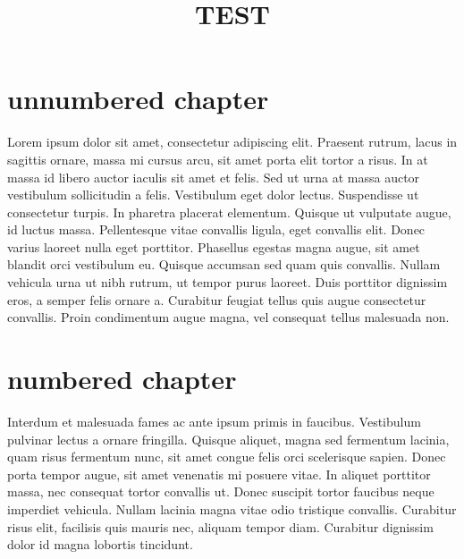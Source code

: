 \documentclass[oneside]{book}
\title {TEST}
\newcommand\addtocchapter[1]{\addcontentsline{toc}{chapter}{#1}}
\begin{document}
\frontmatter


\maketitle

\clearpage

\tableofcontents

\mainmatter

\chapter*{unnumbered chapter}
\addtocchapter{unnumbered chapter}

Lorem ipsum dolor sit amet, consectetur adipiscing elit. Praesent rutrum, lacus in sagittis ornare, massa mi cursus arcu, sit amet porta elit tortor a risus. In at massa id libero auctor iaculis sit amet et felis. Sed ut urna at massa auctor vestibulum sollicitudin a felis. Vestibulum eget dolor lectus. Suspendisse ut consectetur turpis. In pharetra placerat elementum. Quisque ut vulputate augue, id luctus massa. Pellentesque vitae convallis ligula, eget convallis elit. Donec varius laoreet nulla eget porttitor. Phasellus egestas magna augue, sit amet blandit orci vestibulum eu. Quisque accumsan sed quam quis convallis. Nullam vehicula urna ut nibh rutrum, ut tempor purus laoreet. Duis porttitor dignissim eros, a semper felis ornare a. Curabitur feugiat tellus quis augue consectetur convallis. Proin condimentum augue magna, vel consequat tellus malesuada non.


\chapter{numbered chapter}

Interdum et malesuada fames ac ante ipsum primis in faucibus. Vestibulum pulvinar lectus a ornare fringilla. Quisque aliquet, magna sed fermentum lacinia, quam risus fermentum nunc, sit amet congue felis orci scelerisque sapien. Donec porta tempor augue, sit amet venenatis mi posuere vitae. In aliquet porttitor massa, nec consequat tortor convallis ut. Donec suscipit tortor faucibus neque imperdiet vehicula. Nullam lacinia magna vitae odio tristique convallis. Curabitur risus elit, facilisis quis mauris nec, aliquam tempor diam. Curabitur dignissim dolor id magna lobortis tincidunt. 
\end{document}
